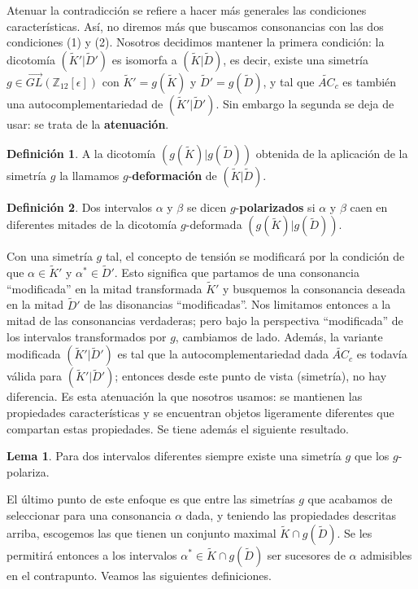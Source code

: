 \documentclass[letterpaper,12pt]{book}
\theoremstyle{definition} \newtheorem{Def}{Definición}[chapter]
\theoremstyle{definition} \newtheorem{Teo}{Teorema}[chapter]
\theoremstyle{definition} \newtheorem{Pro}{Proposición}[chapter]
\theoremstyle{definition} \newtheorem{Lema}{Lema}[chapter]
\begin{document}
Atenuar la contradicción se refiere a hacer más generales las condiciones características. Así, no diremos más que buscamos consonancias con las dos condiciones (1) y (2). Nosotros decidimos mantener la primera condición: la dicotomía $(\tilde{K}'| \tilde{D}')$ es isomorfa a $(\tilde{K}| \tilde{D})$, es decir, existe una simetría $g \in \overrightarrow{GL}(\mathbb{Z}_{12}[\epsilon])$ con $\tilde{K}'=g(\tilde{K})$ y $\tilde{D}'=g(\tilde{D})$, y tal que $\widetilde{AC}_c$ es también una autocomplementariedad de $(\tilde{K}'| \tilde{D}')$. Sin embargo la segunda se deja de usar: se trata de la \textbf{atenuación}. 

\begin{Def}  
A la dicotomía $(g(\tilde{K})|g(\tilde{D}))$ obtenida de la aplicación de la simetría $g$ la llamamos  $g$-\textbf{deformación} de $(\tilde{K}|\tilde{D})$. 
\end{Def}

\begin{Def}  
Dos intervalos $\alpha$ y $\beta$ se dicen $g$-\textbf{polarizados} si $\alpha$ y $\beta$ caen en diferentes mitades de la dicotomía $g$-deformada $(g(\tilde{K})|g(\tilde{D}))$.
\end{Def}

Con una simetría $g$ tal, el concepto de tensión se modificará por la condición de que $\alpha \in \tilde{K}'$ y $\alpha^* \in \tilde{D}'$. Esto significa que partamos de una consonancia ``modificada'' en la mitad transformada $\tilde{K}'$ y busquemos la consonancia deseada en la mitad $\tilde{D}'$ de las disonancias ``modificadas''. Nos limitamos entonces a la mitad de las consonancias verdaderas; pero bajo la perspectiva ``modificada'' de los intervalos transformados por $g$, cambiamos de lado. Además, la variante modificada $(\tilde{K}'| \tilde{D}')$ es tal que la autocomplementariedad dada $\widetilde{AC}_c$ es todavía válida para $(\tilde{K}'| \tilde{D}')$; entonces desde este punto de vista (simetría), no hay diferencia. Es esta atenuación la que nosotros usamos: se mantienen las propiedades características y se encuentran  objetos ligeramente diferentes que compartan estas propiedades. Se tiene además el siguiente resultado.

\begin{Lema}
Para dos intervalos diferentes siempre existe una simetría $g$ que los $g$-polariza.
\end{Lema}

El último punto de este enfoque es que entre las simetrías $g$ que acabamos de seleccionar para una consonancia $\alpha$ dada, y teniendo las propiedades descritas arriba, escogemos las que tienen un conjunto maximal $\tilde{K} \cap g(\tilde{D})$. Se les permitirá entonces a los intervalos $\alpha^* \in \tilde{K} \cap g(\tilde{D})$ ser sucesores de $\alpha$ admisibles en el contrapunto. Veamos las siguientes definiciones.
\end{document}
